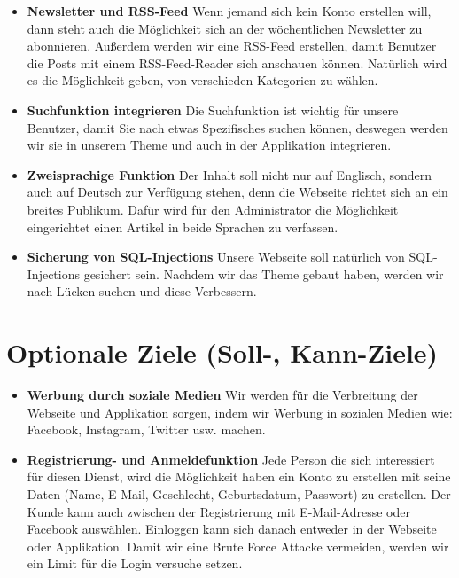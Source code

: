 \begin{itemize}
\item \textbf{Newsletter und RSS-Feed}\newline
Wenn jemand sich kein Konto erstellen will, dann steht auch die Möglichkeit sich an der wöchentlichen Newsletter zu abonnieren. Außerdem werden wir eine RSS-Feed erstellen, damit Benutzer die Posts mit einem RSS-Feed-Reader sich anschauen können. Natürlich wird es die Möglichkeit geben, von verschieden Kategorien zu wählen.

\item \textbf{Suchfunktion integrieren}\newline
Die Suchfunktion ist wichtig für unsere Benutzer, damit Sie nach etwas Spezifisches suchen können, deswegen werden wir sie in unserem Theme und auch in der Applikation integrieren.

\item \textbf{Zweisprachige Funktion}\newline
Der Inhalt soll nicht nur auf Englisch, sondern auch auf Deutsch zur Verfügung stehen, denn die Webseite richtet sich an ein breites Publikum. Dafür wird für den Administrator die Möglichkeit eingerichtet einen Artikel in beide Sprachen zu verfassen. 

\item \textbf{Sicherung von SQL-Injections}\newline
Unsere Webseite soll natürlich von SQL-Injections gesichert sein. Nachdem wir das Theme gebaut haben, werden wir nach Lücken suchen und diese Verbessern.
\end{itemize}

\section*{Optionale Ziele (Soll-, Kann-Ziele)}
\begin{itemize}
\item \textbf{Werbung durch soziale Medien}\newline
Wir werden für die Verbreitung der Webseite und Applikation sorgen, indem wir Werbung in sozialen Medien wie: Facebook, Instagram, Twitter usw. machen.
\item \textbf{Registrierung- und Anmeldefunktion}\newline
Jede Person die sich interessiert für diesen Dienst, wird die Möglichkeit haben ein Konto zu erstellen mit seine Daten (Name, E-Mail, Geschlecht, Geburtsdatum, Passwort) zu erstellen. Der Kunde kann auch zwischen der Registrierung mit E-Mail-Adresse oder Facebook auswählen. Einloggen kann sich danach entweder in der Webseite oder Applikation. Damit wir eine Brute Force Attacke vermeiden, werden wir ein Limit für die Login versuche setzen.
\end{itemize}

